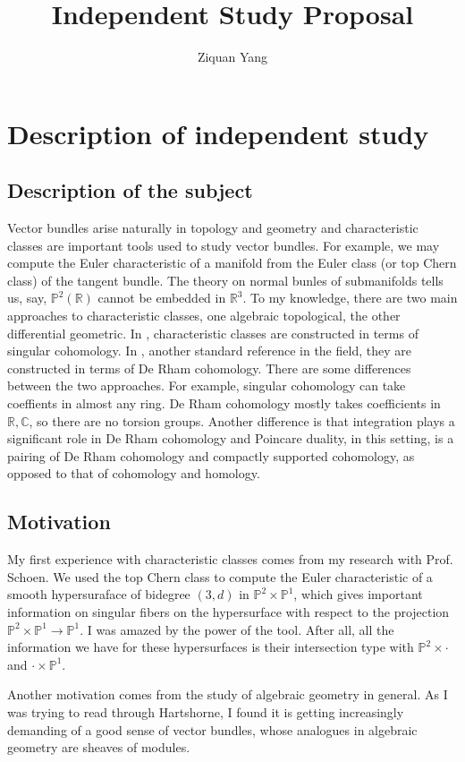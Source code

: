 \documentclass[12pt]{article}
\author{Ziquan Yang}
\title{Independent Study Proposal}
\newcommand{\IC}{\mathbb{C}}
\newcommand{\IP}{\mathbb{P}}
\newcommand{\IR}{\mathbb{R}}
\begin{document}
\section{Description of independent study}
\subsection{Description of the subject}
Vector bundles arise naturally in topology and geometry and  characteristic classes are important tools used to study vector bundles. For example, we may compute the Euler characteristic of a manifold from the Euler class (or top Chern class) of the tangent bundle. The theory on normal bunles of submanifolds tells us, say, $\IP^2(\IR)$ cannot be embedded in $\IR^3$. To my knowledge, there are two main approaches to characteristic classes, one algebraic topological, the other differential geometric. In \cite{Milnor}, characteristic classes are constructed in terms of singular cohomology. In \cite{Bott}, another standard reference in the field, they are constructed in terms of De Rham cohomology. There are some differences between the two approaches. For example, singular cohomology can take coeffients in almost any ring. De Rham cohomology mostly takes coefficients in $\IR, \IC$, so there are no torsion groups. Another difference is that integration plays a significant role in De Rham cohomology and Poincare duality, in this setting, is a pairing of De Rham cohomology and compactly supported cohomology, as opposed to that of cohomology and homology.

\subsection{Motivation}
My first experience with characteristic classes comes from my research with Prof. Schoen. We used the top Chern class to compute the Euler characteristic of a smooth hypersuraface of bidegree $(3, d)$ in $\IP^2 \times \IP^1$, which gives important information on singular fibers on the hypersurface with respect to the projection $\IP^2 \times \IP^1 \to \IP^1$. I was amazed by the power of the tool. After all, all the information we have for these hypersurfaces is their intersection type with $\IP^2 \times \cdot$ and $\cdot \times \IP^1$. 

Another motivation comes from the study of algebraic geometry in general. As I was trying to read through Hartshorne, I found it is getting increasingly demanding of a good sense of vector bundles, whose analogues in algebraic geometry are sheaves of modules. 
\end{document}
